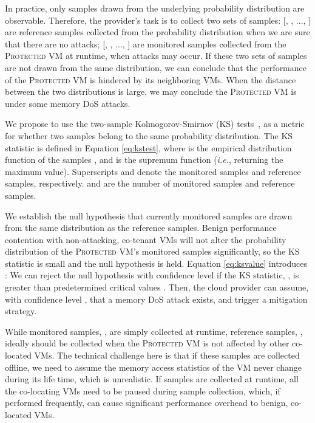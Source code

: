 \documentclass{sig-alternate}
\newcommand{\bheading}[1]{{\vspace{2pt}\noindent{\textbf{#1}}\hspace{2pt}}}
\newcommand{\ie}{\emph{i.e.}\xspace}
\newcommand{\attackname}{memory DoS attacks\xspace}
\newcommand{\aattackname}{memory DoS attack\xspace}
\newcommand{\protectedVM}{\textsc{Protected VM}\xspace}
\begin{document}
In practice, only samples drawn from the underlying probability distribution are
observable. Therefore, the provider's task is to collect two sets of samples:
[, , ..., ]
are reference samples collected from the probability distribution when we are sure that there 
are no attacks;
[, , ..., ]
are monitored samples collected from the \protectedVM at runtime,
when attacks may occur. If these two 
sets of samples are not drawn from the same distribution, we can conclude that the 
performance of the \protectedVM is hindered by its neighboring VMs. When the 
distance between the two distributions is large, we may conclude the \protectedVM 
is under some  \attackname.  


We propose to use the two-sample Kolmogorov-Smirnov (KS) tests~\cite{Ma:51}, as a 
metric for whether two samples belong to the same probability distribution. The 
KS statistic is defined in Equation \ref{eq:kstest}, where  is the 
empirical distribution function of the samples , and  
is the supremum function (\ie, returning the maximum value). Superscripts 
 and  denote the monitored samples and reference samples, 
respectively.  and  are the number of monitored samples and reference 
samples.






\bheading{Null hypothesis for KS test.} 
We establish the null hypothesis that currently monitored samples are drawn from
the same distribution as the reference samples. Benign performance contention with 
non-attacking, co-tenant VMs will not alter the probability distribution of
the \protectedVM's monitored samples significantly, so the KS statistic is small 
and the null hypothesis is held. Equation \ref{eq:ksvalue} introduces :  
We can reject the null hypothesis with confidence level  if the KS 
statistic, , is greater than predetermined 
critical values . Then, the cloud 
provider can assume, with confidence level , that a \aattackname exists, 
and trigger a mitigation strategy.

While monitored samples, , are simply collected at runtime, 
reference samples, , ideally should be collected when the 
\protectedVM is not affected by other co-located VMs. The technical challenge here 
is that if these samples are collected offline, we need to assume the memory 
access statistics of the VM never change during its life time, which is 
unrealistic. If samples are collected at runtime, all the co-locating VMs need to 
be paused during sample collection, which, if performed frequently, can cause 
significant performance overhead to benign, co-located VMs.
\end{document}
